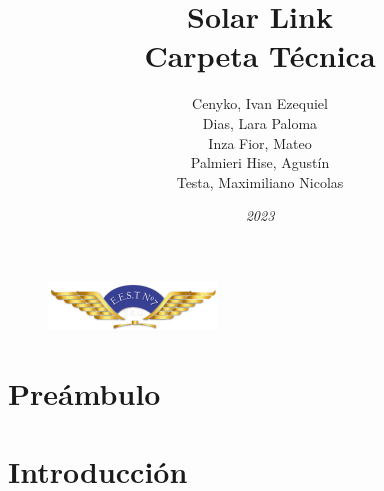 \documentclass{ol-softwaremanual}
\renewcommand{\listoflistingscaption}{List of Code Listings}
\begin{document}
\begin{figure}[b]
\centering
\includegraphics[width=0.4\textwidth]{Main/logo-impa.png}
\end{figure}


\title{Solar Link \\ Carpeta Técnica}
\author{Cenyko, Ivan Ezequiel \\ Dias, Lara Paloma \\ Inza Fior, Mateo \\ Palmieri Hise, Agustín \\ Testa, Maximiliano Nicolas}
\date{\textit{2023}}

\maketitle

\tableofcontents
\renewcommand\listoflistingscaption{Lista de códigos}
\listoflistings %
\newpage

\section{Preámbulo}


\section{Introducción}
\end{document}
